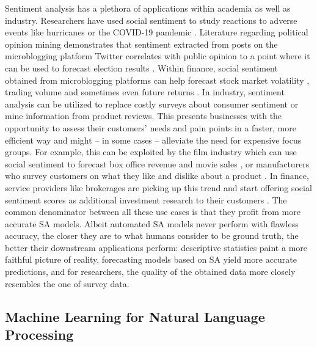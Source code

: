 Sentiment analysis has a plethora of applications within academia as well as industry. Researchers have used social sentiment to study reactions to adverse events like hurricanes  or the COVID-19 pandemic . Literature regarding political opinion mining demonstrates that sentiment extracted from posts on the microblogging platform Twitter correlates with public opinion to a point where it can be used to forecast election results .
Within finance, social sentiment obtained from microblogging platforms can help forecast stock market volatility , trading volume  and sometimes even future returns .
In industry, sentiment analysis can be utilized to replace costly surveys about consumer sentiment or mine information from product reviews. This presents businesses with the opportunity to assess their customers' needs and pain points in a faster, more efficient way and might -- in some cases -- alleviate the need for expensive focus groups. For example, this can be exploited by the film industry which can use social sentiment to forecast box office revenue and movie sales , or manufacturers who survey customers on what they like and dislike about a product .
In finance, service providers like brokerages are picking up this trend and start offering social sentiment scores as additional investment research to their customers \cite{ibkr-sentiment}. The common denominator between all these use cases is that they profit from more accurate SA models. Albeit automated SA models never perform with flawless accuracy, the closer they are to what humans consider to be ground truth, the better their downstream applications perform: descriptive statistics paint a more faithful picture of reality, forecasting models based on SA yield more accurate predictions, and for researchers, the quality of the obtained data more closely resembles the one of survey data.

\subsection{Machine Learning for Natural Language Processing}

